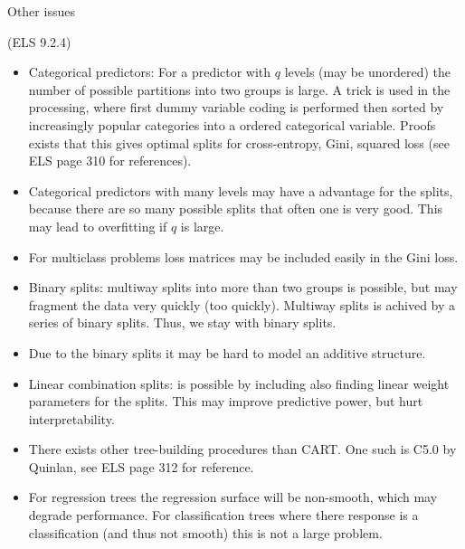 \documentclass[
  ignorenonframetext,
]{beamer}
\providecommand{\tightlist}{%
  \setlength{\itemsep}{0pt}\setlength{\parskip}{0pt}}
\begin{document}
\begin{frame}

\begin{block}{Other issues}

(ELS 9.2.4)

\begin{itemize}
\tightlist
\item
  Categorical predictors: For a predictor with \(q\) levels (may be
  unordered) the number of possible partitions into two groups is large.
  A trick is used in the processing, where first dummy variable coding
  is performed then sorted by increasingly popular categories into a
  ordered categorical variable. Proofs exists that this gives optimal
  splits for cross-entropy, Gini, squared loss (see ELS page 310 for
  references).
\item
  Categorical predictors with many levels may have a advantage for the
  splits, because there are so many possible splits that often one is
  very good. This may lead to overfitting if \(q\) is large.
\item
  For multiclass problems loss matrices may be included easily in the
  Gini loss.
\end{itemize}

\end{block}

\end{frame}

\begin{frame}

\begin{itemize}
\tightlist
\item
  Binary splits: multiway splits into more than two groups is possible,
  but may fragment the data very quickly (too quickly). Multiway splits
  is achived by a series of binary splits. Thus, we stay with binary
  splits.
\item
  Due to the binary splits it may be hard to model an additive
  structure.
\item
  Linear combination splits: is possible by including also finding
  linear weight parameters for the splits. This may improve predictive
  power, but hurt interpretability.
\item
  There exists other tree-building procedures than CART. One such is
  C5.0 by Quinlan, see ELS page 312 for reference.
\item
  For regression trees the regression surface will be non-smooth, which
  may degrade performance. For classification trees where there response
  is a classification (and thus not smooth) this is not a large problem.
\end{itemize}

\end{frame}
\end{document}
